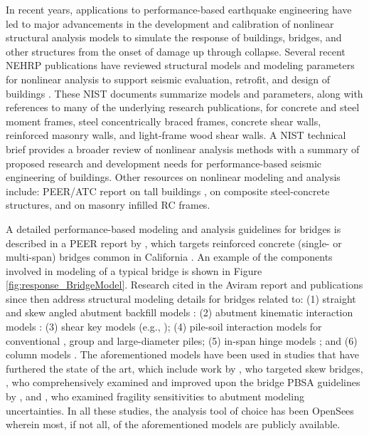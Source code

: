 In recent years, applications to performance-based earthquake engineering have led to major advancements in the development and calibration of nonlinear structural analysis models to simulate the response of buildings, bridges, and other structures from the onset of damage up through collapse. Several recent NEHRP publications have reviewed structural models and modeling parameters for nonlinear analysis to support seismic evaluation, retrofit, and design of buildings \citep{nist2017guidelines, nist2017guidelinesa, nist2017guidelinesb}. These NIST documents summarize models and parameters, along with references to many of the underlying research publications, for concrete and steel moment frames, steel concentrically braced frames, concrete shear walls, reinforced masonry walls, and light-frame wood shear walls. A NIST technical brief \citep{deierlein2010nonlinear} provides a broader review of nonlinear analysis methods with a summary of proposed research and development needs for performance-based seismic engineering of buildings. Other resources on nonlinear modeling and analysis include: PEER/ATC report on tall buildings \citep{malley2010modeling}, \citet{spacone2004nonlinear} on composite steel-concrete structures, and \citet{nurbaiah2017modelling} on masonry infilled RC frames.

A detailed performance-based modeling and analysis guidelines for bridges is described in a PEER report by \citet{aviram2008guidelines}, which targets reinforced concrete (single- or multi-span) bridges common in California \citep{nbi2016national}. An example of the components involved in modeling of a typical bridge is shown in Figure \ref{fig:response_BridgeModel}. Research cited in the Aviram report and publications since then address structural modeling details for bridges related to: (1) straight and skew angled abutment backfill models \citep{shamsabadi2010validated}: (2) abutment kinematic interaction models \citep{zhang2002kinematic}: (3) shear key models (e.g., \cite{silva2009seismic}); (4) pile-soil interaction models for conventional \citep{hutchinson2001inelastic, taciroglu2006robust}, group \citep{lemnitzer2010nonlinear} and large-diameter \citep{khalili-tehrani2014nonlinear} piles; (5) in-span hinge models \citep{hube2008experimental}; and (6) column models \citep{terzic2015concrete, xu2011hysteretic}. The aforementioned models have been used in studies that have furthered the state of the art, which include work by \citet{kaviani2014performancebased}, who targeted skew bridges, \citet{omrani2015guidelines}, who comprehensively examined and improved upon the bridge PBSA guidelines by \citet{aviram2008guidelines}, and \citet{omrani2017variability}, who examined fragility sensitivities to abutment modeling uncertainties. In all these studies, the analysis tool of choice has been OpenSees \citep{mckenna2011opensees} wherein most, if not all, of the aforementioned models are publicly available. 

